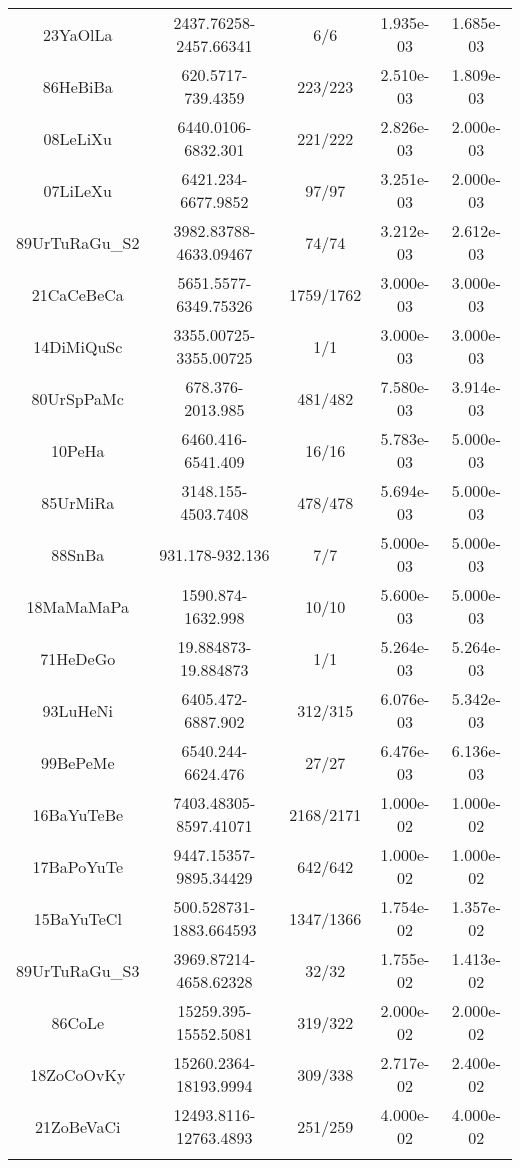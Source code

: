 \begin{longtable}{c c c c c}
23YaOlLa \cite{23YaOlLa} & 2437.76258-2457.66341 & 6/6 & 1.935e-03 & 1.685e-03 \\
86HeBiBa \cite{86HeBiBa} & 620.5717-739.4359 & 223/223 & 2.510e-03 & 1.809e-03 \\
08LeLiXu \cite{08LeLiXu} & 6440.0106-6832.301 & 221/222 & 2.826e-03 & 2.000e-03 \\
07LiLeXu \cite{07LiLeXu} & 6421.234-6677.9852 & 97/97 & 3.251e-03 & 2.000e-03 \\
89UrTuRaGu_S2 \cite{89UrTuRaGu_S2} & 3982.83788-4633.09467 & 74/74 & 3.212e-03 & 2.612e-03 \\
21CaCeBeCa \cite{21CaCeBeCa} & 5651.5577-6349.75326 & 1759/1762 & 3.000e-03 & 3.000e-03 \\
14DiMiQuSc \cite{14DiMiQuSc} & 3355.00725-3355.00725 & 1/1 & 3.000e-03 & 3.000e-03 \\
80UrSpPaMc \cite{80UrSpPaMc} & 678.376-2013.985 & 481/482 & 7.580e-03 & 3.914e-03 \\
10PeHa \cite{10PeHa} & 6460.416-6541.409 & 16/16 & 5.783e-03 & 5.000e-03 \\
85UrMiRa \cite{85UrMiRa} & 3148.155-4503.7408 & 478/478 & 5.694e-03 & 5.000e-03 \\
88SnBa \cite{88SnBa} & 931.178-932.136 & 7/7 & 5.000e-03 & 5.000e-03 \\
18MaMaMaPa \cite{18MaMaMaPa} & 1590.874-1632.998 & 10/10 & 5.600e-03 & 5.000e-03 \\
71HeDeGo \cite{71HeDeGo} & 19.884873-19.884873 & 1/1 & 5.264e-03 & 5.264e-03 \\
93LuHeNi \cite{93LuHeNi} & 6405.472-6887.902 & 312/315 & 6.076e-03 & 5.342e-03 \\
99BePeMe \cite{99BePeMe} & 6540.244-6624.476 & 27/27 & 6.476e-03 & 6.136e-03 \\
16BaYuTeBe \cite{16BaYuTeBe} & 7403.48305-8597.41071 & 2168/2171 & 1.000e-02 & 1.000e-02 \\
17BaPoYuTe \cite{17BaPoYuTe} & 9447.15357-9895.34429 & 642/642 & 1.000e-02 & 1.000e-02 \\
15BaYuTeCl \cite{15BaYuTeCl} & 500.528731-1883.664593 & 1347/1366 & 1.754e-02 & 1.357e-02 \\
89UrTuRaGu_S3 \cite{89UrTuRaGu_S3} & 3969.87214-4658.62328 & 32/32 & 1.755e-02 & 1.413e-02 \\
86CoLe \cite{86CoLe} & 15259.395-15552.5081 & 319/322 & 2.000e-02 & 2.000e-02 \\
18ZoCoOvKy \cite{18ZoCoOvKy} & 15260.2364-18193.9994 & 309/338 & 2.717e-02 & 2.400e-02 \\
21ZoBeVaCi \cite{21ZoBeVaCi} & 12493.8116-12763.4893 & 251/259 & 4.000e-02 & 4.000e-02 \\
\hline
\caption{}
\end{longtable}